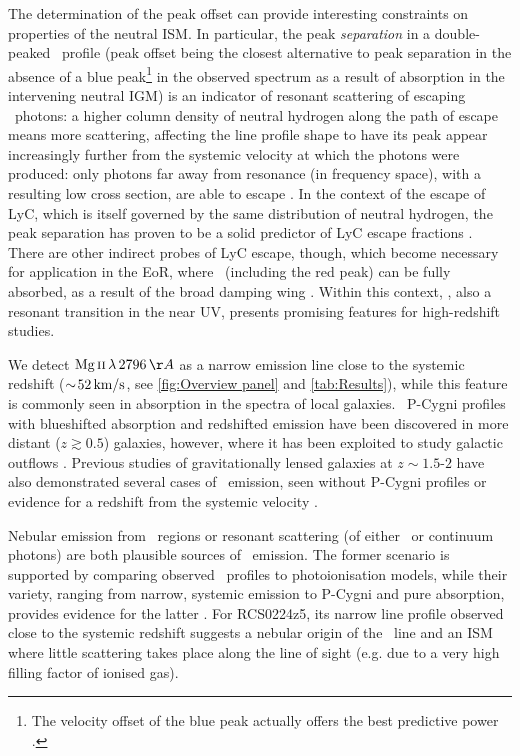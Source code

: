 The determination of the peak offset can provide interesting constraints on properties of the neutral ISM. In particular, the peak \emph{separation} in a double-peaked \lya\ profile (peak offset being the closest alternative to peak separation in the absence of a blue peak\footnote{The velocity offset of the blue peak actually offers the best predictive power \citep{2017A&A...597A..13V}.} in the observed spectrum as a result of absorption in the intervening neutral IGM) is an indicator of resonant scattering of escaping \lya\ photons: a higher column density of neutral hydrogen along the path of escape means more scattering, affecting the line profile shape to have its peak appear increasingly further from the systemic velocity at which the photons were produced: only photons far away from resonance (in frequency space), with a resulting low cross section, are able to escape \citep[e.g.][]{2017A&A...597A..13V}. In the context of the escape of LyC, which is itself governed by the same distribution of neutral hydrogen, the peak separation has proven to be a solid predictor of LyC escape fractions \citep{2017A&A...597A..13V, 2018MNRAS.478.4851I, 2020A&A...639A..85G}. There are other indirect probes of LyC escape, though, which become necessary for application in the EoR, where \lya\ (including the red peak) can be fully absorbed, as a result of the broad damping wing \citep[e.g.][]{2014PASA...31...40D}. Within this context, \MgII, also a resonant transition in the near UV, presents promising features for high-redshift studies.

We detect $\MgII \, \lambda \, 2796 \, \Angstrom$ as a narrow emission line close to the systemic redshift ($\sim \! 52 \, \mathrm{km/s}$, see \cref{fig:Overview panel} and \cref{tab:Results}), while this feature is commonly seen in absorption in the spectra of local galaxies. \MgII\ P-Cygni profiles with blueshifted absorption and redshifted emission have been discovered in more distant ($z \gtrsim 0.5$) galaxies, however, where it has been exploited to study galactic outflows \citep[e.g.][]{2009ApJ...692..187W, 2010ApJ...719.1503R, 2011ApJ...728...55R, 2011ApJ...743...95G, 2012ApJ...759...26E, 2013ApJ...774...50K, 2016MNRAS.458.1891B, 2017A&A...608A...7F}. Previous studies of gravitationally lensed galaxies at $z \sim 1.5$-$2$ have also demonstrated several cases of \MgII\ emission, seen without P-Cygni profiles or evidence for a redshift from the systemic velocity \citep{2010MNRAS.402.2335P, 2014ApJ...790...44R, 2016A&A...585A..27K}.

Nebular emission from \HII\ regions or resonant scattering (of either \MgII\ or continuum photons) are both plausible sources of \MgII\ emission. The former scenario is supported by comparing observed \MgII\ profiles to photoionisation models, while their variety, ranging from narrow, systemic emission to P-Cygni and pure absorption, provides evidence for the latter \citep{2010ApJ...719.1503R, 2012ApJ...759...26E, 2018A&A...617A..62F}. For RCS0224z5, its narrow line profile observed close to the systemic redshift suggests a nebular origin of the \MgII\ line and an ISM where little scattering takes place along the line of sight (e.g. due to a very high filling factor of ionised gas).

